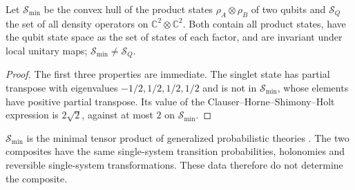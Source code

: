 \begin{proposition}\label{prop:comp}
Let $\mathcal{S}_{\min}$ be the convex hull of the product states $\rho_A\otimes\rho_B$ of two qubits and $\mathcal{S}_Q$ the set of all density operators on $\mathbb{C}^2\otimes\mathbb{C}^2$. Both contain all product states, have the qubit state space as the set of states of each factor, and are invariant under local unitary maps; $\mathcal{S}_{\min}\ne\mathcal{S}_Q$.
\end{proposition}
\begin{proof}
The first three properties are immediate. The singlet state has partial transpose with eigenvalues $-1/2,1/2,1/2,1/2$ and is not in $\mathcal{S}_{\min}$, whose elements have positive partial transpose. Its value of the Clauser--Horne--Shimony--Holt expression is $2\sqrt2$, against at most $2$ on $\mathcal{S}_{\min}$.
\end{proof}
$\mathcal{S}_{\min}$ is the minimal tensor product of generalized probabilistic theories \cite{ewc}. The two composites have the same single-system transition probabilities, holonomies and reversible single-system transformations. These data therefore do not determine the composite.

